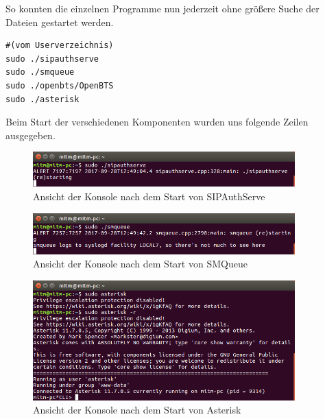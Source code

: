 So konnten die einzelnen Programme nun jederzeit ohne größere Suche der Dateien gestartet werden.
\begin{lstlisting}
#(vom Userverzeichnis)
sudo ./sipauthserve
sudo ./smqueue
sudo ./openbts/OpenBTS
sudo ./asterisk
\end{lstlisting}

Beim Start der verschiedenen Komponenten wurden uns folgende Zeilen ausgegeben.\\
\begin{figure}[htbp]
	\centering
		\includegraphics[width=0.90\textwidth]{includes/Start_sipauthserve}
	\caption{Ansicht der Konsole nach dem Start von SIPAuthServe}
	\label{fig:start_sipauthserve}
\end{figure}

\begin{figure}[htbp]
	\centering
		\includegraphics[width=0.90\textwidth]{includes/Start_smqueue}
	\caption{Ansicht der Konsole nach dem Start von SMQueue}
	\label{fig:start_smqueue}
\end{figure}

\begin{figure}[htbp]
	\centering
		\includegraphics[width=0.90\textwidth]{includes/Start_asterisk}
	\caption{Ansicht der Konsole nach dem Start von Asterisk}
	\label{fig:start_asterisk}
\end{figure}

